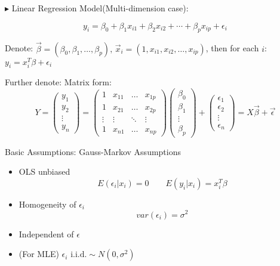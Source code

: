 \documentclass[11pt,a4paper]{ctexart}
\numberwithin{equation}{section}%
\newenvironment{point}{\raggedright$\blacktriangleright$}{}%
\begin{document}
\begin{point}
    Linear Regression Model(Multi-dimension case):
\end{point}

    
\[
    y_i=\beta_0+\beta_1x_{i1}+\beta_2x_{i2}+\cdots+\beta_px_{ip}+\epsilon_i    
\]

    Denote: $\vec{\beta}=(\beta_0,\beta_1,\ldots,\beta_p),\, \vec{x}_i=(1,x_{i1},x_{i2},\ldots,x_{ip})$, then for each $i$: $y_i=x_i^T\beta+\epsilon_i$

    Further denote: Matrix form:
    \[
        Y=\begin{pmatrix}
            y_1\\
            y_2\\
            \vdots\\
            y_n
        \end{pmatrix}  
        =
        \begin{pmatrix}
            1&x_{11}&\ldots&x_{1p}\\
            1&x_{21}&\ldots&x_{2p}\\
            \vdots&\vdots&\ddots&\vdots\\
            1&x_{n1}&\ldots&x_{np}
        \end{pmatrix}
        \begin{pmatrix}
            \beta_0\\
            \beta_1\\
            \vdots\\
            \beta_p
        \end{pmatrix}
        +
        \begin{pmatrix}
            \epsilon_1\\
            \epsilon_2\\
            \vdots\\
            \epsilon_n
        \end{pmatrix}
        =X\vec{\beta}+\vec{\epsilon}
    \]

    Basic Assumptions: Gauss-Markov Assumptions
    \begin{itemize}
        \item OLS unbiased\[E(\epsilon_i|x_i)=0\qquad E(y_i|x_i)=x_i^T\beta\]
        \item Homogeneity of $\epsilon_i$\[var(\epsilon_i)=\sigma^2\]
        \item Independent of $\epsilon$
        \item (For MLE) $\epsilon_i\text{ i.i.d.}\sim N(0,\sigma^2)$
    \end{itemize}
\end{document}
